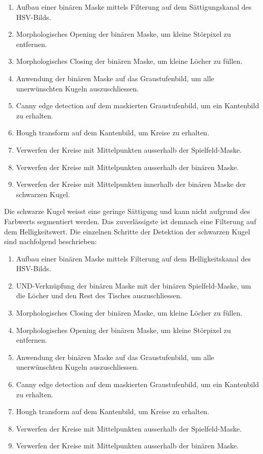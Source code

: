 \begin{enumerate}
  \item Aufbau einer binären Maske mittels Filterung auf dem Sättigungskanal des HSV-Bilds.
  \item Morphologisches Opening der binären Maske, um kleine Störpixel zu entfernen.
  \item Morphologisches Closing der binären Maske, um kleine Löcher zu füllen.
  \item Anwendung der binären Maske auf das Graustufenbild, um alle unerwünschten Kugeln auszuschliessen.
  \item Canny edge detection \cite{canny_edge_detection} auf dem maskierten Graustufenbild, um ein Kantenbild zu erhalten.
  \item Hough transform auf dem Kantenbild, um Kreise zu erhalten.
  \item Verwerfen der Kreise mit Mittelpunkten ausserhalb der Spielfeld-Maske.
  \item Verwerfen der Kreise mit Mittelpunkten ausserhalb der binären Maske.
  \item Verwerfen der Kreise mit Mittelpunkten innerhalb der binären Maske der schwarzen Kugel.
\end{enumerate}

Die schwarze Kugel weisst eine geringe Sättigung und kann nicht aufgrund des Farbwerts segmentiert werden.
Das zuverlässigste ist demnach eine Filterung auf dem Helligkeitswert.
Die einzelnen Schritte der Detektion der schwarzen Kugel sind nachfolgend beschrieben:

\begin{enumerate}
  \item Aufbau einer binären Maske mittels Filterung auf dem Helligkeitskanal des HSV-Bilds.
  \item UND-Verknüpfung der binären Maske mit der binären Spielfeld-Maske, um die Löcher und den Rest des Tisches auszuschliessen.
  \item Morphologisches Closing der binären Maske, um kleine Löcher zu füllen.
  \item Morphologisches Opening der binären Maske, um kleine Störpixel zu entfernen.
  \item Anwendung der binären Maske auf das Graustufenbild, um alle unerwünschten Kugeln auszuschliessen.
  \item Canny edge detection auf dem maskierten Graustufenbild, um ein Kantenbild zu erhalten.
  \item Hough transform auf dem Kantenbild, um Kreise zu erhalten.
  \item Verwerfen der Kreise mit Mittelpunkten ausserhalb der Spielfeld-Maske.
  \item Verwerfen der Kreise mit Mittelpunkten ausserhalb der binären Maske.
\end{enumerate}

